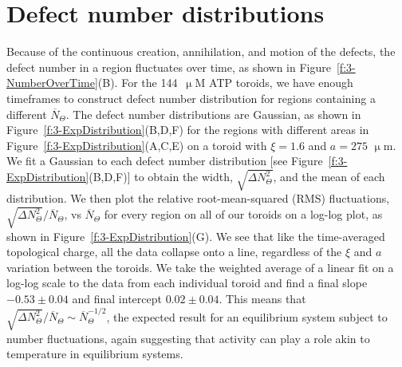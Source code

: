 \section{Defect number distributions}
Because of the continuous creation, annihilation, and motion of the defects, the defect number in a region fluctuates over time, as shown in Figure~\ref{f:3-NumberOverTime}(B).
For the 144~$\upmu$M ATP toroids, we have enough timeframes to construct defect number distribution for regions containing a different $\overbar{N}_{\Theta}$.
The defect number distributions are Gaussian, as shown in Figure~\ref{f:3-ExpDistribution}(B,D,F) for the regions with different areas in Figure~\ref{f:3-ExpDistribution}(A,C,E) on a toroid with $\xi = 1.6$ and $a = 275$ $\upmu$m.
We fit a Gaussian to each defect number distribution [see Figure~\ref{f:3-ExpDistribution}(B,D,F)] to obtain the width, $\displaystyle{\sqrt{\Delta N_{\Theta}^2}}$, and the mean of each distribution.
We then plot the relative root-mean-squared (RMS) fluctuations, $\displaystyle{\sqrt{\Delta N_{\Theta}^2}} \bigg / \displaystyle {\overbar{N}_{\Theta}}$, vs $\overbar{N}_{\Theta}$ for every region on all of our toroids on a log-log plot, as shown in Figure~\ref{f:3-ExpDistribution}(G).
We see that like the time-averaged topological charge, all the data collapse onto a line, regardless of the $\xi$ and $a$ variation between the toroids.
We take the weighted average of a linear fit on a log-log scale to the data from each individual toroid and find a final slope $-0.53 \pm 0.04$ and final intercept $0.02 \pm 0.04$.
This means that $\displaystyle{\sqrt{\Delta N_{\Theta}^2}} \bigg / \displaystyle {\overbar{N}_{\Theta}} \sim \overbar{N}_{\Theta}^{-1/2}$, the expected result for an equilibrium system subject to number fluctuations, again suggesting that activity can play a role akin to temperature in equilibrium systems.
